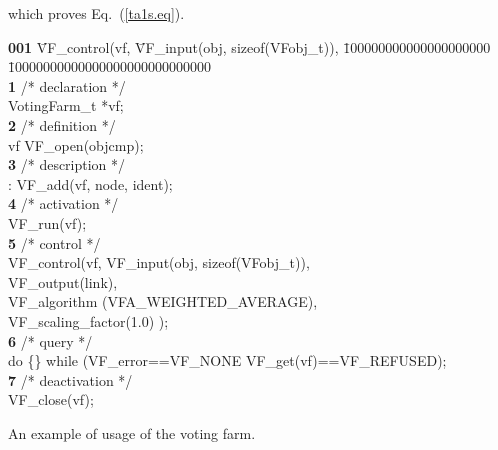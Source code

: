 \documentclass[11pt]{article}
\begin{document}
which proves Eq.~(\ref{ta1s.eq}).

\vfill\eject



\begin{table}[h]
\begin{small}
\begin{sf}
\vspace*{-52pt}
\begin{tabbing}
{\bf 001} \= VF\_control(vf, \=VF\_input(obj, sizeof(VFobj\_t)), \= 100000000000000000000 \= 10000000000000000000000000000 \kill\\
{\bf 1} \>  /* declaration */\\
        \> VotingFarm\_t *vf;\\
{\bf 2} \> /* definition */\\
        \> vf  VF\_open(objcmp);\\
{\bf 3} \> /* description */\\
        \>  : VF\_add(vf, node, ident);\\
{\bf 4} \> /* activation */\\
        \> VF\_run(vf); \\
{\bf 5} \> /* control */\\
        \> VF\_control(vf, VF\_input(obj, sizeof(VFobj\_t)), \\
	\>\>		   VF\_output(link),\\
	\>\>		   VF\_algorithm (VFA\_WEIGHTED\_AVERAGE),\\
	\>\>		   VF\_scaling\_factor(1.0) );\\
{\bf 6} \> /* query */\\
        \> do \{\} while (VF\_error==VF\_NONE \hskip10pt  \hskip10pt VF\_get(vf)==VF\_REFUSED);\\
{\bf 7} \> /* deactivation */\\
        \> VF\_close(vf);
\end{tabbing}
\vspace*{-15pt}
\end{sf}
\end{small}
\caption{An example of usage of the voting farm.}
\label{example}
\end{table}

\vfill\eject
\end{document}
